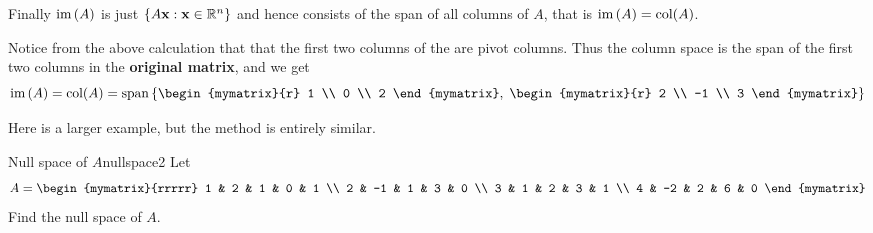 \begin{solution}
Finally $\mbox{im}\left( A\right) $ is just $\left\{ A{\bf x} :
{\bf x} \in \mathbb{R}^n \right\}$ and hence consists of the span of
all columns of $A$, that is $\mbox{im}\left( A\right) = \mbox{col} (A)$. 

Notice from the above calculation that that the first two columns of the {\rref} are pivot
columns. Thus the  column space is the span of the first two  columns in
the \textbf{original matrix}, and we get 
\begin{equation*}
\func{im}\left( A\right) = \func{col}(A) =
\func{span} \left\{ \begin{mymatrix}{r}
1 \\ 
0 \\ 
2 
\end{mymatrix}, \; \begin{mymatrix}{r}
2 \\ 
-1 \\ 
3 
\end{mymatrix}  \right\}
\end{equation*}

\end{solution}

Here is a larger example, but the method is entirely similar.

\begin{example}{Null space of $A$}{nullspace2}
Let
\begin{equation*}
A=\begin{mymatrix}{rrrrr}
1 & 2 & 1 & 0 & 1 \\
2 & -1 & 1 & 3 & 0 \\
3 & 1 & 2 & 3 & 1 \\
4 & -2 & 2 & 6 & 0
\end{mymatrix}
\end{equation*}
Find the null space of $A$.
\end{example}

